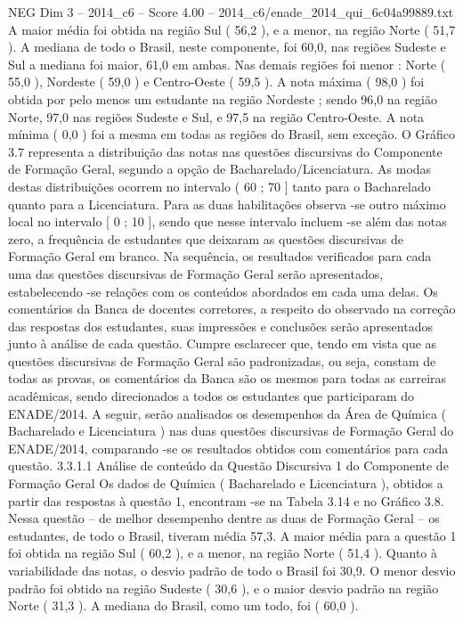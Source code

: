 \begin{textsample}{NEG Dim 3 – 2014\_c6 – Score 4.00 – 2014\_c6/enade\_2014\_qui\_6c04a99889.txt}
A maior média foi obtida na região Sul ( 56,2 ), e a menor, na região Norte ( 51,7 ).
A mediana de todo o Brasil, neste componente, foi 60,0, nas regiões Sudeste e Sul a mediana foi maior, 61,0 em ambas.
Nas demais regiões foi menor : Norte ( 55,0 ), Nordeste ( 59,0 ) e Centro-Oeste ( 59,5 ).
A nota máxima ( 98,0 ) foi obtida por pelo menos um estudante na região Nordeste ; sendo 96,0 na região Norte, 97,0 nas regiões Sudeste e Sul, e 97,5 na região Centro-Oeste.
A nota mínima ( 0,0 ) foi a mesma em todas as regiões do Brasil, sem exceção.
O Gráfico 3.7 representa a distribuição das notas nas questões discursivas do Componente de Formação Geral, segundo a opção de Bacharelado/Licenciatura.
As modas destas distribuições ocorrem no intervalo ( 60 ; 70 ] tanto para o Bacharelado quanto para a Licenciatura.
Para as duas habilitações observa -se outro máximo local no intervalo [ 0 ; 10 ], sendo que nesse intervalo incluem -se além das notas zero, a frequência de estudantes que deixaram as questões discursivas de Formação Geral em branco.
Na sequência, os resultados verificados para cada uma das questões discursivas de Formação Geral serão apresentados, estabelecendo -se relações com os conteúdos abordados em cada uma delas.
Os comentários da Banca de docentes corretores, a respeito do observado na correção das respostas dos estudantes, suas impressões e conclusões serão apresentados junto à análise de cada questão.
Cumpre esclarecer que, tendo em vista que as questões discursivas de Formação Geral são padronizadas, ou seja, constam de todas as provas, os comentários da Banca são os mesmos para todas as carreiras acadêmicas, sendo direcionados a todos os estudantes que participaram do ENADE/2014.
A seguir, serão analisados os desempenhos da Área de Química ( Bacharelado e Licenciatura ) nas duas questões discursivas de Formação Geral do ENADE/2014, comparando -se os resultados obtidos com comentários para cada questão. 3.3.1.1 Análise de conteúdo da Questão Discursiva 1 do Componente de Formação Geral Os dados de Química ( Bacharelado e Licenciatura ), obtidos a partir das respostas à questão 1, encontram -se na Tabela 3.14 e no Gráfico 3.8.
Nessa questão – de melhor desempenho dentre as duas de Formação Geral – os estudantes, de todo o Brasil, tiveram média 57,3.
A maior média para a questão 1 foi obtida na região Sul ( 60,2 ), e a menor, na região Norte ( 51,4 ).
Quanto à variabilidade das notas, o desvio padrão de todo o Brasil foi 30,9.
O menor desvio padrão foi obtido na região Sudeste ( 30,6 ), e o maior desvio padrão na região Norte ( 31,3 ).
A mediana do Brasil, como um todo, foi ( 60,0 ).

\end{textsample}
